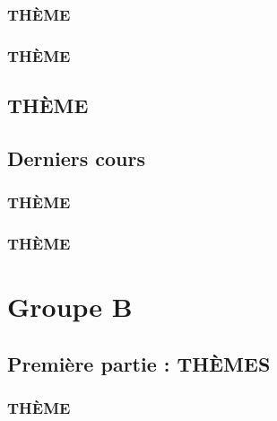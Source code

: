 \documentclass[poly,trombi]{valbonne}
\begin{document}

\subsection{THÈME}


\subsection{THÈME}


\section{THÈME}






\section{Derniers cours}

\subsection{THÈME}


\subsection{THÈME}


\chapter{Groupe B}

\minitoc \clearpage

\section{Première partie : THÈMES}

\subsection{THÈME}

\end{document}
